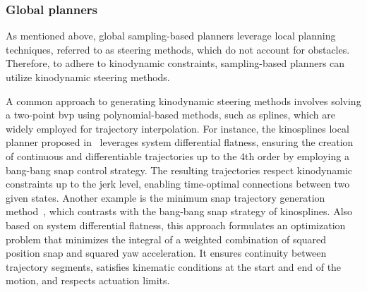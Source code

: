 \subsubsection{Global planners}\label{sec:forwardplanning}



As mentioned above, global sampling-based planners leverage local planning techniques, referred to as steering methods, which do not account for obstacles. 
Therefore, to adhere to kinodynamic constraints, sampling-based planners can utilize kinodynamic steering methods.

A common approach to generating kinodynamic steering methods involves solving a two-point \gls{bvp} using polynomial-based methods, such as splines, which are widely employed for trajectory interpolation. 
For instance, the kinosplines local planner proposed in~\cite{cKino} leverages system differential flatness, ensuring the creation of continuous and differentiable trajectories up to the 4th order by employing a bang-bang snap control strategy. 
The resulting trajectories respect kinodynamic constraints up to the jerk level, enabling time-optimal connections between two given states.
Another example is the minimum snap trajectory generation method~\cite{cMinimumSnap}, which contrasts with the bang-bang snap strategy of kinosplines. 
Also based on system differential flatness, this approach formulates an optimization problem that minimizes the integral of a weighted combination of squared position snap and squared yaw acceleration.
It ensures continuity between trajectory segments, satisfies kinematic conditions at the start and end of the motion, and respects actuation limits.

